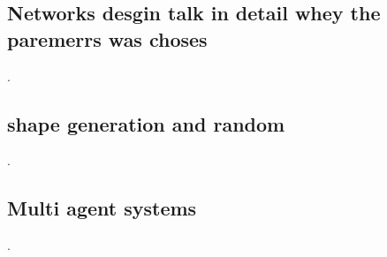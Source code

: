 \documentclass[12pt]{extarticle}
\begin{document}
\subsection{Networks desgin talk in detail whey the paremerrs was choses}. 
\subsection{shape generation and random}. 

\subsection{Multi agent systems}. 










 


\newpage


\end{document}

